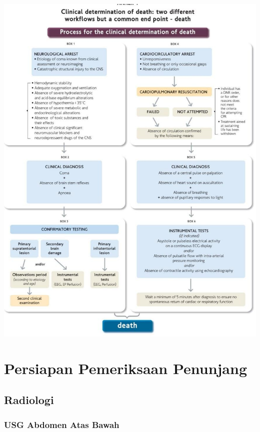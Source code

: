 \documentclass[
]{book}
\begin{document}
\begin{center}\includegraphics[width=11.93in]{Death} \end{center}

\hypertarget{persiapan-pemeriksaan-penunjang}{%
\section{Persiapan Pemeriksaan Penunjang}\label{persiapan-pemeriksaan-penunjang}}

\hypertarget{radiologi}{%
\subsection{Radiologi}\label{radiologi}}

\hypertarget{usg-abdomen-atas-bawah}{%
\subsubsection{USG Abdomen Atas Bawah}\label{usg-abdomen-atas-bawah}}
\end{document}
